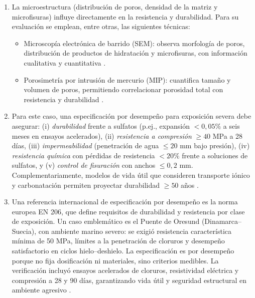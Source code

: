 \begin{enumerate}
    \item La microestructura (distribución de poros, densidad de la matriz y microfisuras) influye directamente en la resistencia y durabilidad. Para su evaluación se emplean, entre otras, las siguientes técnicas:
    \begin{itemize}
        \item Microscopía electrónica de barrido (SEM): observa morfología de poros, distribución de productos de hidratación y microfisuras, con información cualitativa y cuantitativa \citep{Diamond1999}.
        \item Porosimetría por intrusión de mercurio (MIP): cuantifica tamaño y volumen de poros, permitiendo correlacionar porosidad total con resistencia y durabilidad \citep{Gallucci2012}.
    \end{itemize}
    
    \item Para este caso, una especificación por desempeño para exposición severa debe asegurar: (i) \textit{durabilidad} frente a sulfatos (p.ej., expansión $<0{,}05\%$ a seis meses en ensayos acelerados), (ii) \textit{resistencia a compresión} $\geq 40$ MPa a 28 días, (iii) \textit{impermeabilidad} (penetración de agua $\leq 20$ mm bajo presión), (iv) \textit{resistencia química} con pérdidas de resistencia $<20\%$ frente a soluciones de sulfatos, y (v) \textit{control de fisuración} con anchos $\leq 0{,}2$ mm. Complementariamente, modelos de vida útil que consideren transporte iónico y carbonatación permiten proyectar durabilidad $\geq 50$ años \citep{NCh170-2016,ConcreteSociety2006}.
    
    \item Una referencia internacional de especificación por desempeño es la norma europea EN 206, que define requisitos de durabilidad y resistencia por clase de exposición. Un caso emblemático es el Puente de Oresund (Dinamarca–Suecia), con ambiente marino severo: se exigió resistencia característica mínima de 50 MPa, límites a la penetración de cloruros y desempeño satisfactorio en ciclos hielo–deshielo. La especificación es por desempeño porque no fija dosificación ni materiales, sino criterios medibles. La verificación incluyó ensayos acelerados de cloruros, resistividad eléctrica y compresión a 28 y 90 días, garantizando vida útil y seguridad estructural en ambiente agresivo \citep{EN206,ConcreteSociety2006}.
\end{enumerate}
